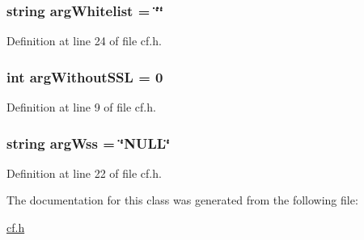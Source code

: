 \subsubsection[{\texorpdfstring{arg\+Whitelist}{argWhitelist}}]{\setlength{\rightskip}{0pt plus 5cm}string arg\+Whitelist = \char`\"{}\char`\"{}}\hypertarget{class_k_1_1_c_f_a007fd80e3d8d6bc1f57ce7fb36e6f7e7}{}\label{class_k_1_1_c_f_a007fd80e3d8d6bc1f57ce7fb36e6f7e7}


Definition at line 24 of file cf.\+h.

\subsubsection[{\texorpdfstring{arg\+Without\+S\+SL}{argWithoutSSL}}]{\setlength{\rightskip}{0pt plus 5cm}int arg\+Without\+S\+SL = 0}\hypertarget{class_k_1_1_c_f_a71b0bc0bf8c0ade7768ed08a3163ae0b}{}\label{class_k_1_1_c_f_a71b0bc0bf8c0ade7768ed08a3163ae0b}


Definition at line 9 of file cf.\+h.

\subsubsection[{\texorpdfstring{arg\+Wss}{argWss}}]{\setlength{\rightskip}{0pt plus 5cm}string arg\+Wss = \char`\"{}N\+U\+LL\char`\"{}}\hypertarget{class_k_1_1_c_f_ab6402172f1adc2b82968e480816c5df8}{}\label{class_k_1_1_c_f_ab6402172f1adc2b82968e480816c5df8}


Definition at line 22 of file cf.\+h.



The documentation for this class was generated from the following file\+:\begin{DoxyCompactItemize}
\item 
\hyperlink{cf_8h}{cf.\+h}\end{DoxyCompactItemize}
